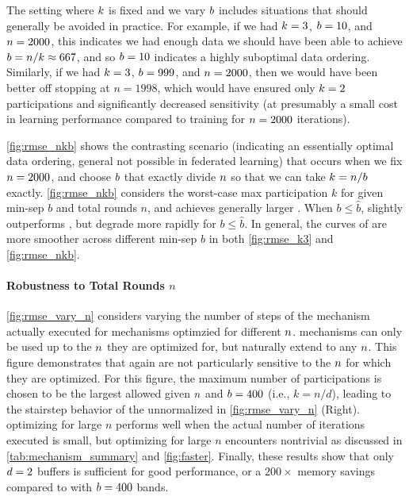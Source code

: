 The setting where $k$ is fixed and we vary $b$ includes situations that should generally be avoided in practice. For example, if we had $k=3$, $b=10$, and $n=2000$, this indicates we had enough data we should have been able to achieve $b = n/k \approx 667$, and so $b=10$ indicates a highly suboptimal data ordering.  Similarly, if we had $k=3$, $b=999$, and $n=2000$, then we would have been better off stopping at $n=1998$, which would have ensured only $k=2$ participations and significantly decreased sensitivity (at presumably a small cost in learning performance compared to training for $n=2000$ iterations).

\cref{fig:rmse_nkb} shows the contrasting scenario (indicating an essentially optimal data ordering, general not possible in federated learning) that occurs when we fix $n = 2000$, and choose $b$ that exactly divide $n$ so that we can take $k = n / b$ exactly. \cref{fig:rmse_nkb} considers the worst-case max participation $k$ for given min-sep $b$ and total rounds $n$, and achieves generally larger \rmsloss. When $b \leq \hat b$, \bandmf slightly outperforms \blts, but \bandmf degrade more rapidly for $b \leq \hat b$. In general, the curves of \blts are more smoother across different min-sep $b$ in both \cref{fig:rmse_k3} and \cref{fig:rmse_nkb}.

\paragraph{Robustness to Total Rounds $n$} \cref{fig:rmse_vary_n} considers varying the number of steps of the mechanism actually executed for mechanisms optimzied for different $n$. \bandmf mechanisms can only be used up to the $n$ they are optimized for, but \blts naturally extend to any $n$. This figure demonstrates that again \blts are not particularly sensitive to the $n$ for which they are optimized. For this figure, the maximum number of participations is chosen to be the largest allowed given $n$ and $b=400$ (i.e., $k=n/d$), leading to the stairstep behavior of the unnormalized \rmsloss in \cref{fig:rmse_vary_n} (Right). \bandmf optimizing for large $n$ performs well when the actual number of iterations executed is small, but optimizing for large $n$ encounters nontrivial as discussed in \cref{tab:mechanism_summary} and \cref{fig:faster}. Finally, these results show that only $d=2$ buffers is sufficient for good performance, or a $200\times$ memory savings compared to \bandmf with $b=400$ bands.

